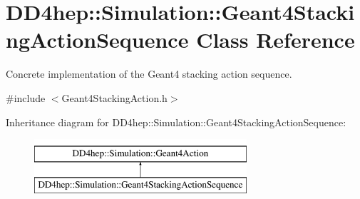\hypertarget{class_d_d4hep_1_1_simulation_1_1_geant4_stacking_action_sequence}{}\section{D\+D4hep\+:\+:Simulation\+:\+:Geant4\+Stacking\+Action\+Sequence Class Reference}
\label{class_d_d4hep_1_1_simulation_1_1_geant4_stacking_action_sequence}


Concrete implementation of the Geant4 stacking action sequence.  




{\ttfamily \#include $<$Geant4\+Stacking\+Action.\+h$>$}

Inheritance diagram for D\+D4hep\+:\+:Simulation\+:\+:Geant4\+Stacking\+Action\+Sequence\+:\begin{figure}[H]
\begin{center}
\leavevmode
\includegraphics[height=2.000000cm]{class_d_d4hep_1_1_simulation_1_1_geant4_stacking_action_sequence}
\end{center}
\end{figure}
